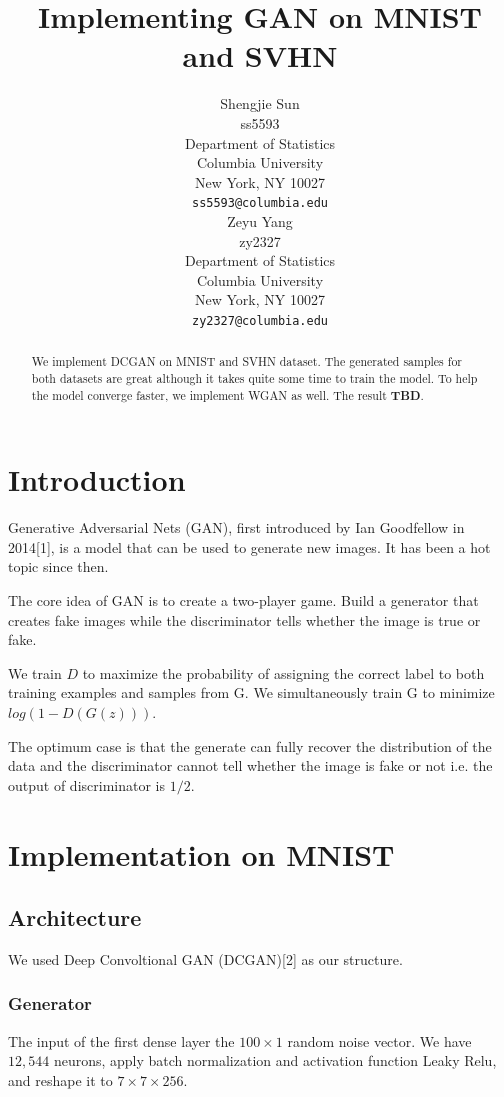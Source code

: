 \documentclass{article}
\title{Implementing GAN on MNIST and SVHN}
\author{%
  Shengjie Sun \\
  ss5593\\
  Department of Statistics\\
  Columbia University\\
  New York, NY 10027 \\
  \texttt{ss5593@columbia.edu} \\
  \And
  Zeyu Yang \\
  zy2327 \\
  Department of Statistics\\
  Columbia University\\
  New York, NY 10027 \\
  \texttt{zy2327@columbia.edu}
}
\begin{document}
\maketitle

\begin{abstract}
  We implement DCGAN on MNIST and SVHN dataset.
  The generated samples for both datasets are great although it takes quite some time to train the model.
  To help the model converge faster, we implement WGAN as well.
  The result \textbf{TBD}.
\end{abstract}

\section{Introduction}

Generative Adversarial Nets (GAN), first introduced by Ian Goodfellow in 2014[1], is a model that can be used to generate new images. 
It has been a hot topic since then.

The core idea of GAN is to create a two-player game. 
Build a generator that creates fake images while the discriminator tells whether the image is true or fake.

We train $D$ to maximize the probability of assigning the
correct label to both training examples and samples from G. 
We simultaneously train G to minimize $log(1-D(G(z)))$.

The optimum case is that the generate can fully recover the distribution of the data and the discriminator cannot tell whether the image is fake or not i.e. the output of discriminator is $1/2$.

\section{Implementation on MNIST}

\subsection{Architecture}

We used Deep Convoltional GAN (DCGAN)[2] as our structure.

\subsubsection{Generator}

The input of the first dense layer the $100\times 1$ random noise vector. 
We have $12,544$ neurons, apply batch normalization and activation function Leaky Relu, and reshape it to $7\times 7\times 256$.
\end{document}
